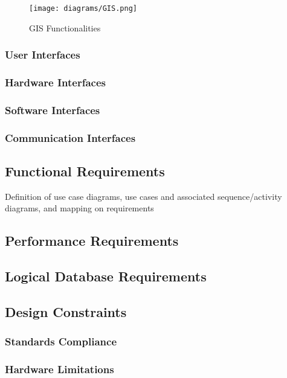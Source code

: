 	\begin{figure}[h]
		\centering
		\texttt{[image: diagrams/GIS.png]}
		\caption{
			\label{fig:externalGIS} GIS Functionalities}
	\end{figure}

\subsubsection{User Interfaces}
\label{sec:3userinterface}

\subsubsection{Hardware Interfaces}
\subsubsection{Software Interfaces}
\subsubsection{Communication Interfaces}


\subsection{Functional Requirements}
Definition of use case diagrams, use cases and associated sequence/activity diagrams, and mapping on requirements

\subsection{Performance Requirements}

\subsection{Logical Database Requirements}

\subsection{Design Constraints}

\subsubsection{Standards Compliance}
\subsubsection{Hardware Limitations}
